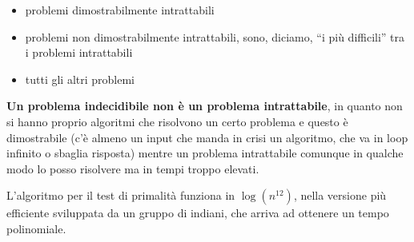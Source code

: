 \begin{itemize}
  \item problemi dimostrabilmente intrattabili
  \item problemi non dimostrabilmente intrattabili, sono, diciamo, ``i più
  difficili'' tra i problemi intrattabili
  \item tutti gli altri problemi
\end{itemize}
\textbf{Un problema indecidibile non è un problema intrattabile}, in quanto non
si hanno proprio algoritmi che risolvono un certo problema e questo è
dimostrabile (c'è almeno un input che manda in crisi un algoritmo, che va in
loop infinito o sbaglia risposta) mentre un problema intrattabile comunque in
qualche modo lo posso risolvere ma in tempi troppo elevati.
\begin{shaded}
  L'algoritmo per il test di primalità funziona in $\log (n^{12})$, nella
  versione più efficiente sviluppata da un gruppo di indiani, che arriva ad
  ottenere un tempo polinomiale.
\end{shaded}
